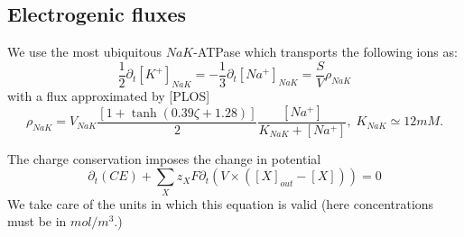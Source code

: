 \documentclass{revtex4}
\begin{document}
\subsection{Electrogenic fluxes}
We use the most ubiquitous $NaK$-ATPase which transports the following ions as:
\begin{equation}
	\dfrac{1}{2} \partial_t \left[K^+\right]_{{NaK}} = -\dfrac{1}{3} \partial_t \left[ Na^+\right]_{{NaK}}
	= \dfrac{S}{V}\rho_{NaK}
\end{equation}
with a flux approximated by [PLOS]
\begin{equation}
	\rho_{NaK} = V_{NaK} \dfrac{\left[1+\tanh\left(0.39\zeta+1.28\right)\right]}{2}\dfrac{\left[Na^+\right]}{K_{NaK}+\left[Na^+\right]},\;K_{NaK}\simeq12mM.
\end{equation}

The charge conservation imposes the change in potential
\begin{equation}
	\partial_t\left( C E\right) + \sum_X z_X F \partial_t\left( V \times  (\left[X\right]_{out}-\left[X\right]) \right) = 0
\end{equation}
We take care of the units in which this equation is valid (here concentrations must be in $mol/m^3$.)
\end{document}

